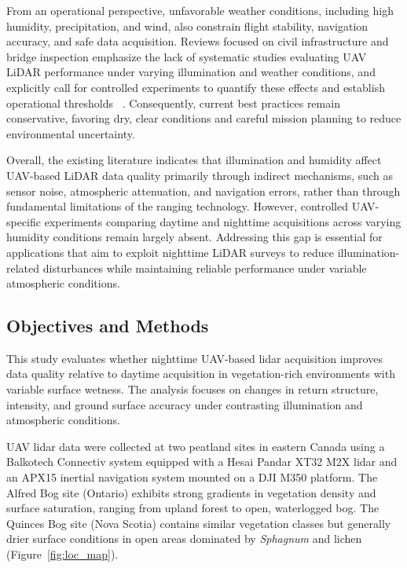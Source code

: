 \documentclass{isprs} %
\begin{document}
From an operational perspective, unfavorable weather conditions, including high humidity, precipitation, and wind, also constrain flight stability, navigation accuracy, and safe data acquisition. Reviews focused on civil infrastructure and bridge inspection emphasize the lack of systematic studies evaluating UAV LiDAR performance under varying illumination and weather conditions, and explicitly call for controlled experiments to quantify these effects and establish operational thresholds ~\cite{ferozUAVBasedRemoteSensing2021}. Consequently, current best practices remain conservative, favoring dry, clear conditions and careful mission planning to reduce environmental uncertainty.

Overall, the existing literature indicates that illumination and humidity affect UAV-based LiDAR data quality primarily through indirect mechanisms, such as sensor noise, atmospheric attenuation, and navigation errors, rather than through fundamental limitations of the ranging technology. However, controlled UAV-specific experiments comparing daytime and nighttime acquisitions across varying humidity conditions remain largely absent. Addressing this gap is essential for applications that aim to exploit nighttime LiDAR surveys to reduce illumination-related disturbances while maintaining reliable performance under variable atmospheric conditions.

\subsection{Objectives and Methods}\label{sec:objectives}

This study evaluates whether nighttime UAV-based lidar acquisition improves data quality relative to daytime acquisition in vegetation-rich environments with variable surface wetness. The analysis focuses on changes in return structure, intensity, and ground surface accuracy under contrasting illumination and atmospheric conditions.

UAV lidar data were collected at two peatland sites in eastern Canada using a Balkotech Connectiv system equipped with a Hesai Pandar XT32 M2X lidar and an APX15 inertial navigation system mounted on a DJI M350 platform. The Alfred Bog site (Ontario) exhibits strong gradients in vegetation density and surface saturation, ranging from upland forest to open, waterlogged bog. The Quinces Bog site (Nova Scotia) contains similar vegetation classes but generally drier surface conditions in open areas dominated by \textit{Sphagnum} and lichen (Figure~\ref{fig:loc_map}).
\end{document}
